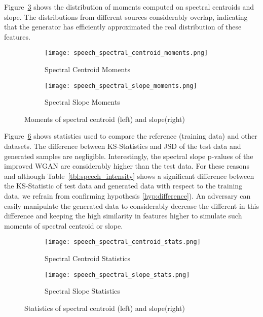 Figure~\ref{fig:speech_moments} shows the distribution of moments computed on
spectral centroids and slope. The distributions from different sources
considerably overlap, indicating that the generator has efficiently approximated
the real distribution of these features.

\begin{figure}[!h]
    \centering
    \begin{subfigure}[b]{0.45\textwidth}
        \texttt{[image: speech\_spectral\_centroid\_moments.png]}
        \caption{Spectral Centroid Moments}
        \label{fig:speech_spectral_centroid_moments}
    \end{subfigure}
    \quad
    \begin{subfigure}[b]{0.45\textwidth}
        \texttt{[image: speech\_spectral\_slope\_moments.png]}
        \caption{Spectral Slope Moments}
        \label{fig:speech_spectral_slope_moments}
    \end{subfigure}
    \caption{Moments of spectral centroid (left) and slope(right)}
    \label{fig:speech_moments}
\end{figure}

Figure~\ref{fig:speech_spectral_stats} shows statistics used to compare the
reference (training data) and other datasets. The difference between
KS-Statistics and JSD of the test data and generated samples are negligible.
Interestingly, the spectral slope p-values of the improved WGAN are considerably
higher than the test data. For these reasons and although 
Table~\ref{tbl:speech_intensity} shows a significant difference between the 
KS-Statistic of test data and generated data with respect to the training
data, we refrain from confirming hypothesis \ref{hyp:difference}). An adversary
can easily manipulate the generated data to considerably decrease the different
in this difference and keeping the high similarity in features higher to
simulate such moments of spectral centroid or slope. 
\begin{figure}[!h]
    \centering
    \begin{subfigure}[b]{.45\textwidth}
        \texttt{[image: speech\_spectral\_centroid\_stats.png]}
        \caption{Spectral Centroid Statistics}
        \label{fig:speech_spectral_centroid_stats}
    \end{subfigure}
    \quad
    \begin{subfigure}[b]{.45\textwidth}
        \texttt{[image: speech\_spectral\_slope\_stats.png]}
        \caption{Spectral Slope Statistics}
        \label{fig:speech_spectral_slope_stats}
    \end{subfigure}
    \caption{Statistics of spectral centroid (left) and slope(right)}
    \label{fig:speech_spectral_stats}
\end{figure}
